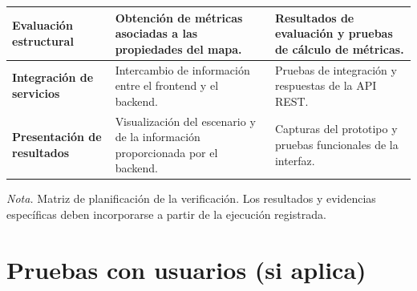 \begin{table}[htbp]
\begin{tabularx}{\textwidth}{
        |>{\raggedright\arraybackslash}p{3cm}|
         >{\raggedright\arraybackslash}X|
         >{\raggedright\arraybackslash}X|
    }
        \textbf{Evaluación estructural} &
        Obtención de métricas asociadas a las
        propiedades del mapa. &
        Resultados de evaluación y pruebas
        de cálculo de métricas. \\

        \hline

        \textbf{Integración de servicios} &
        Intercambio de información entre el
        frontend y el backend. &
        Pruebas de integración y respuestas
        de la API REST. \\

        \hline

        \textbf{Presentación de resultados} &
        Visualización del escenario y de la
        información proporcionada por el backend. &
        Capturas del prototipo y pruebas
        funcionales de la interfaz. \\

        \hline

    \end{tabularx}

    \par\smallskip
    \raggedright

    \textit{Nota.} Matriz de planificación de la verificación. Los resultados y evidencias específicas deben incorporarse a partir de la ejecución registrada.

\end{table}
\FloatBarrier
{}

\section{Pruebas con usuarios (si aplica)}
